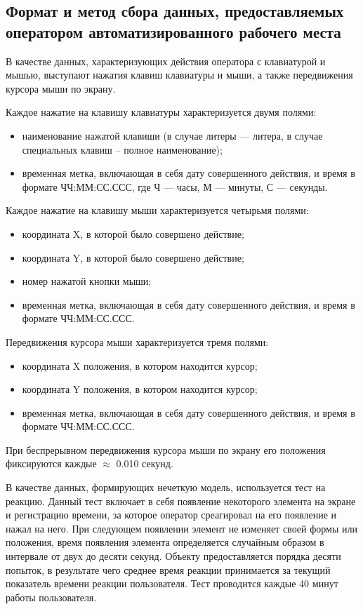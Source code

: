 \subsection{Формат и метод сбора данных, предоставляемых оператором автоматизированного рабочего места}
В качестве данных, характеризующих действия оператора с клавиатурой и мышью, выступают нажатия клавиш клавиатуры и мыши, а также передвижения курсора мыши по экрану.

Каждое нажатие на клавишу клавиатуры характеризуется двумя полями:
\begin{itemize}[leftmargin=1.6\parindent]
\item наименование нажатой клавиши (в случае литеры --- литера, в случае специальных клавиш -- полное наименование);
\item временная метка, включающая в себя дату совершенного действия, и время в формате ЧЧ:ММ:СС.ССС, где Ч --- часы, М --- минуты, С --- секунды.
\end{itemize}

Каждое нажатие на клавишу мыши характеризуется четырьмя полями:
\begin{itemize}[leftmargin=1.6\parindent]
\item координата X, в которой было совершено действие;
\item координата Y, в которой было совершено действие;
\item номер нажатой кнопки мыши;
\item временная метка, включающая в себя дату совершенного действия, и время в формате ЧЧ:ММ:СС.ССС.
\end{itemize}

Передвижения курсора мыши характеризуется тремя полями:
\begin{itemize}[leftmargin=1.6\parindent]
\item координата X положения, в котором находится курсор;
\item координата Y положения, в котором находится курсор;
\item временная метка, включающая в себя дату совершенного действия, и время в формате ЧЧ:ММ:СС.ССС.
\end{itemize}

При беспрерывном передвижения курсора мыши по экрану его положения фиксируются каждые $\approx$ 0.010 секунд.

В качестве данных, формирующих нечеткую модель, используется тест на реакцию. Данный тест включает в себя появление некоторого элемента на экране и регистрацию времени, за которое оператор среагировал на его появление и нажал на него. При следующем появлении элемент не изменяет своей формы или положения, время появления элемента определяется случайным образом в интервале от двух до десяти секунд. Объекту предоставляется порядка десяти попыток, в результате чего среднее время реакции принимается за текущий показатель времени реакции пользователя. Тест проводится каждые 40 минут работы пользователя.

